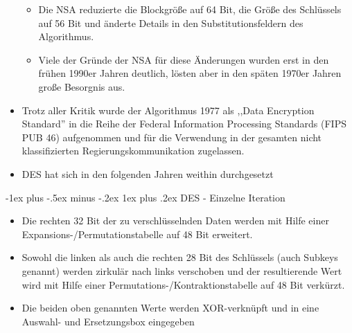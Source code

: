 \documentclass[a4paper]{article}
\makeatletter
\renewcommand{\subsubsection}{\@startsection{subsubsection}{3}{0mm}%
 {-1ex plus -.5ex minus -.2ex}%
 {1ex plus .2ex}%
 {\normalfont\small\bfseries}}
\makeatother
\begin{document}
\begin{multicols}{3}
\begin{itemize}
              \begin{itemize}
                  \item
                        Die NSA reduzierte die Blockgröße auf 64 Bit, die Größe des
                        Schlüssels auf 56 Bit und änderte Details in den
                        Substitutionsfeldern des Algorithmus.
                  \item
                        Viele der Gründe der NSA für diese Änderungen wurden erst in den
                        frühen 1990er Jahren deutlich, lösten aber in den späten 1970er
                        Jahren große Besorgnis aus.
              \end{itemize}
        \item
              Trotz aller Kritik wurde der Algorithmus 1977 als ,,Data Encryption
              Standard'' in die Reihe der Federal Information Processing Standards
              (FIPS PUB 46) aufgenommen und für die Verwendung in der gesamten nicht
              klassifizierten Regierungskommunikation zugelassen.
        \item
              DES hat sich in den folgenden Jahren weithin durchgesetzt
    \end{itemize}




    \subsubsection{DES - Einzelne
        Iteration}

    \begin{itemize}
        \item
              Die rechten 32 Bit der zu verschlüsselnden Daten werden mit Hilfe
              einer Expansions-/Permutationstabelle auf 48 Bit erweitert.
        \item
              Sowohl die linken als auch die rechten 28 Bit des Schlüssels (auch
              Subkeys genannt) werden zirkulär nach links verschoben und der
              resultierende Wert wird mit Hilfe einer
              Permutations-/Kontraktionstabelle auf 48 Bit verkürzt.
        \item
              Die beiden oben genannten Werte werden XOR-verknüpft und in eine
              Auswahl- und Ersetzungsbox eingegeben


\end{itemize}
\end{multicols}
\end{document}
